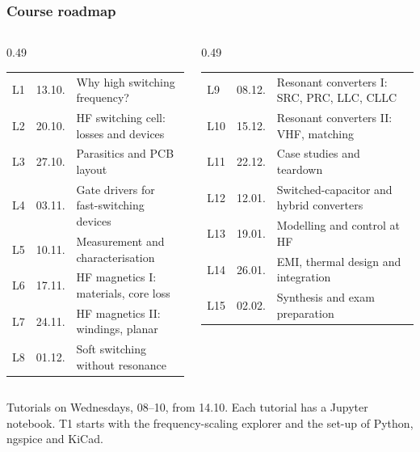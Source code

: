 \begin{frame}
	\frametitle{Course roadmap}
	\begin{columns}[T]
		\begin{column}{0.49\textwidth}
			\footnotesize
			\begin{tabular}{|l|l|>{\raggedright\arraybackslash}p{4.7cm}|}
				\hline
				L1 & 13.10. & Why high switching frequency?                                  \\
				L2 & 20.10. & HF switching cell: losses and devices     \\
				L3 & 27.10. & Parasitics and PCB layout              \\
				L4 & 03.11. & Gate drivers for fast-switching devices                        \\
				L5 & 10.11. & Measurement and characterisation                         \\
				L6 & 17.11. & HF magnetics I: materials, core loss       \\
				L7 & 24.11. & HF magnetics II: windings, planar      \\
				L8 & 01.12. & Soft switching without resonance                               \\
				\hline
			\end{tabular}
		\end{column}
		\begin{column}{0.49\textwidth}
			\footnotesize
			\begin{tabular}{|l|l|>{\raggedright\arraybackslash}p{4.7cm}|}
				\hline
				L9  & 08.12. & Resonant converters I: SRC, PRC, LLC, CLLC                    \\
				L10 & 15.12. & Resonant converters II: VHF, matching \\
				L11 & 22.12. & Case studies and teardown                                     \\
				L12 & 12.01. & Switched-capacitor and hybrid converters                      \\
				L13 & 19.01. & Modelling and control at HF                                   \\
				L14 & 26.01. & EMI, thermal design and integration                           \\
				L15 & 02.02. & Synthesis and exam preparation               \\
				\hline
			\end{tabular}
		\end{column}
	\end{columns}
	\vspace{0.4cm}
	Tutorials on Wednesdays, 08--10, from 14.10. Each tutorial has a Jupyter notebook. T1 starts with the frequency-scaling explorer and the set-up of Python, ngspice and KiCad.
\end{frame}

